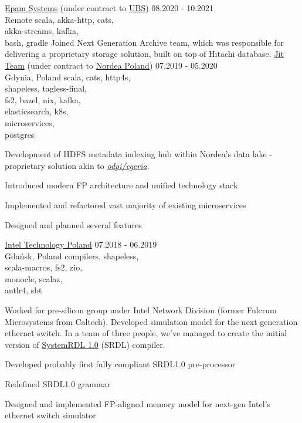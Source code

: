       {\href{https://www.epam.com}{Epam Systems} (under contract to \href{https://www.ubs.com}{UBS})}
      {08.2020 - 10.2021\\Remote}
      {scala, akka-http, cats,\\akka-streams, kafka,\\bash, gradle}
      {Joined Next Generation Archive team, which was responsible for delivering a proprietary storage solution,
        built on top of Hitachi database.
      }
      {\href{https://www.jit.team}{Jit Team} (under contract to \href{https://www.nordea.com}{Nordea Poland})}
      {07.2019 - 05.2020\\Gdynia, Poland}
      {scala, cats, http4s,\\shapeless, tagless-final,\\fs2, bazel, nix, kafka,\\elasticsearch, k8s,\\microservices,\\postgres
      }
      {Development of HDFS metadata indexing hub within Nordea's data lake - proprietary solution akin to \href{https://egeria.odpi.org}{\emph{odpi/egeria}}.
        \begin{missions}
          \item Introduced modern FP architecture and unified technology stack
          \item Implemented and refactored vast majority of existing microservices
          \item Designed and planned several features
        \end{missions}
      }
      {\href{https://www.intel.com/content/www/us/en/jobs/locations/poland.html}{Intel Technology Poland}}
      {07.2018 - 06.2019\\Gdańsk, Poland}
      {compilers, shapeless,\\scala-macros, fs2, zio,\\monocle, scalaz,\\antlr4, sbt}
      {Worked for pre-silicon group under Intel Network Division (former Fulcrum Microsystems from Caltech).
        Developed simulation model for the next generation ethernet switch. In a team of three people, we've
        managed to create the initial version of
        \href{https://www.accellera.org/downloads/standards/systemrdl}{SystemRDL 1.0} (SRDL) compiler.
        \begin{missions}
          \item Developed probably first fully compliant SRDL1.0 pre-processor
          \item Redefined SRDL1.0 grammar
          \item Designed and implemented FP-aligned memory model for next-gen Intel's ethernet switch simulator
        \end{missions}
      }
